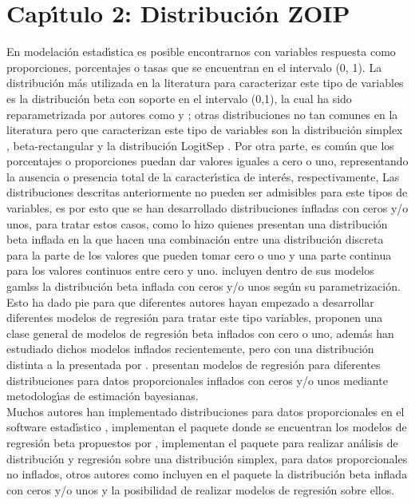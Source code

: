 \chapter{Cap\'{\i}tulo 2: Distribuci\'{o}n ZOIP} \label{cap2}

En modelaci\'{o}n estad\'{\i}stica es posible encontrarnos con variables respuesta como proporciones, porcentajes o tasas que se encuentran en el intervalo (0, 1). La distribuci\'{o}n m\'{a}s utilizada en la literatura para caracterizar este tipo de variables es la distribuci\'{o}n beta con soporte en el intervalo (0,1), la cual ha sido reparametrizada por autores como \cite{Ferrari2} y \cite{Stasinopoulos2}; otras distribuciones no tan comunes en la literatura pero que caracterizan este tipo de variables son la distribuci\'{o}n simplex \citep{Jorgensen1}, beta-rectangular \citep{Hahn1} y la distribuci\'{o}n LogitSep \citep{Hossain1}. Por otra parte, es com\'{u}n que los porcentajes o proporciones puedan dar valores iguales a cero o uno, re\-pre\-sen\-tan\-do la ausencia o presencia total de la caracter\'{\i}stica de inter\'{e}s, respectivamente, Las distribuciones descritas anteriormente no pueden ser admisibles para este tipos de variables, es por esto que se han desarrollado distribuciones infladas con ceros y/o unos, para tratar estos casos, como lo hizo \cite{Ospina2} quienes presentan una distribuci\'{o}n beta inflada en la que hacen una combinaci\'{o}n entre una distribuci\'{o}n discreta para la parte de los valores que pueden tomar cero o uno y una parte continua para los valores continuos entre cero y uno. \cite{Stasinopoulos2} incluyen dentro de sus modelos gamlss la distribuci\'{o}n beta inflada con ceros y/o unos seg\'{u}n su parametrizaci\'{o}n.\\

Esto ha dado pie para que diferentes autores hayan empezado a desarrollar diferentes mo\-de\-los de regresi\'{o}n para tratar este tipo variables, \cite{Ospina1} proponen una clase general de modelos de regresi\'{o}n beta inflados con cero o uno, adem\'{a}s \cite{Kosmidis1} han estudiado dichos modelos inflados recientemente, pero con una distribuci\'{o}n distinta a la presentada por \cite{Ospina1}. \cite{Galvis1} presentan modelos de regresi\'{o}n para diferentes distribuciones para datos proporcionales inflados con ceros y/o unos mediante metodolog\'{\i}as de estimaci\'{o}n bayesianas.\\

Muchos autores han implementado distribuciones para datos proporcionales en el software estad\'{\i}stico , \cite{Zeileis1} implementan el paquete  donde se encuentran los modelos de regresi\'{o}n beta propuestos por \cite{Ferrari2}, \cite{Qiu1} implementan el paquete  para realizar an\'{a}lisis de distribuci\'{o}n y regresi\'{o}n sobre una distribuci\'{o}n simplex, para datos proporcionales no inflados, otros autores como \citep{Stasinopoulos1} incluyen en el paquete  la distribuci\'{o}n beta inflada con ceros y/o unos y la posibilidad de realizar modelos de regresi\'{o}n sobre ellos.\\

